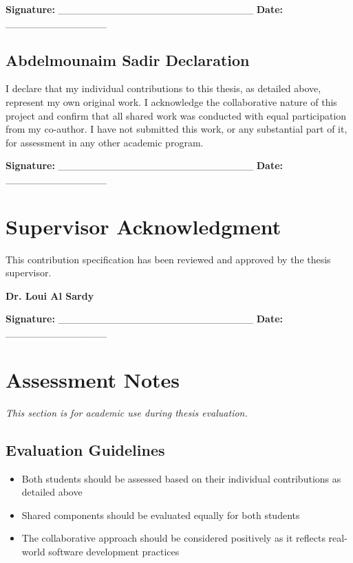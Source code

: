 \textbf{Signature:} \_\_\_\_\_\_\_\_\_\_\_\_\_\_\_\_\_\_\_\_\_\_\_\_\_\_\_ \textbf{Date:} \_\_\_\_\_\_\_\_\_\_\_\_\_\_

\subsection{Abdelmounaim Sadir Declaration}
I declare that my individual contributions to this thesis, as detailed above, represent my own original work. I acknowledge the collaborative nature of this project and confirm that all shared work was conducted with equal participation from my co-author. I have not submitted this work, or any substantial part of it, for assessment in any other academic program.

\textbf{Signature:} \_\_\_\_\_\_\_\_\_\_\_\_\_\_\_\_\_\_\_\_\_\_\_\_\_\_\_ \textbf{Date:} \_\_\_\_\_\_\_\_\_\_\_\_\_\_

\section{Supervisor Acknowledgment}

This contribution specification has been reviewed and approved by the thesis supervisor.

\textbf{Dr. Loui Al Sardy}

\textbf{Signature:} \_\_\_\_\_\_\_\_\_\_\_\_\_\_\_\_\_\_\_\_\_\_\_\_\_\_\_ \textbf{Date:} \_\_\_\_\_\_\_\_\_\_\_\_\_\_

\section{Assessment Notes}

\textit{This section is for academic use during thesis evaluation.}

\subsection{Evaluation Guidelines}
\begin{itemize}
\item Both students should be assessed based on their individual contributions as detailed above
\item Shared components should be evaluated equally for both students
\item The collaborative approach should be considered positively as it reflects real-world software development practices
\end{itemize}

